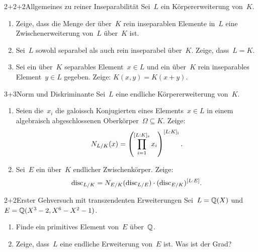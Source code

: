 \documentclass{algblatt}
\begin{document}

\begin{aufgabe}{2+2+2}{Allgemeines zu reiner Inseparabilität}
Sei~$L$ ein Körpererweiterung von~$K$.
\begin{enumerate}
\item Zeige, dass die Menge der über~$K$ rein inseparablen Elemente in~$L$ eine
Zwischenerweiterung von~$L$ über~$K$ ist.
\item Sei~$L$ sowohl separabel als auch rein inseparabel über~$K$. Zeige,
dass~$L = K$.
\item Sei ein über~$K$ separables Element~$x \in L$ und ein über~$K$ rein
inseparables Element~$y \in L$ gegeben. Zeige: $K(x,y) = K(x+y)$.
\end{enumerate}
\end{aufgabe}

\begin{aufgabe}{3+3}{Norm und Diskriminante}
Sei~$L$ eine endliche Körpererweiterung von~$K$.
\begin{enumerate}
\item Seien die~$x_i$ die galoissch Konjugierten eines Elements~$x \in L$ in
einem algebraisch abgeschlossenen Oberkörper~$\Omega \subseteq K$. Zeige:
\[ N_{L/K}(x) = \left(\prod_{i=1}^{[L:K]_\text{s}}
x_i\right)^{[L:K]_\text{i}}. \]
\item Sei~$E$ ein über~$K$ endlicher Zwischenkörper. Zeige:
\[ \mathrm{disc}_{L/K} = N_{E/K}(\mathrm{disc}_{L/E}) \cdot (\mathrm{disc}_{E/K})^{[L:E]}. \]
\end{enumerate}
\end{aufgabe}

\begin{aufgabe}{2+2}{Erster Gehversuch mit transzendenten Erweiterungen}
Sei~$L = \mathbb{Q}(X)$ und~$E = \mathbb{Q}(X^3 - 2, X^6 - X^2 - 1)$.
\begin{enumerate}
\item Finde ein primitives Element von~$E$ über~$\mathbb{Q}$.
\item Zeige, dass~$L$ eine endliche Erweiterung von~$E$ ist. Was ist der Grad?
\end{enumerate}
\end{aufgabe}
\end{document}
